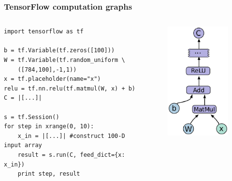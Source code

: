 \documentclass[10pt,utf8]{beamer}
\begin{document}
\begin{frame}[fragile]
	\frametitle{TensorFlow computation graphs}
	\begin{columns}
		\begin{lstlisting}[style=Python]
import tensorflow as tf

b = tf.Variable(tf.zeros([100]))
W = tf.Variable(tf.random_uniform \
	([784,100],-1,1))
x = tf.placeholder(name="x")
relu = tf.nn.relu(tf.matmul(W, x) + b)
C = |[...]|

s = tf.Session()
for step in xrange(0, 10):
	x_in = |[...]| #construct 100-D input array
	result = s.run(C, feed_dict={x: x_in})
	print step, result
		\end{lstlisting}
		\vspace{-1.5cm}
		\hspace{-1cm}
		\begin{figure}
			\centering
			\includegraphics[width=4cm]{./img/tensorflow_graph.eps}
		\end{figure}
	\end{columns}
\end{frame}
\end{document}
